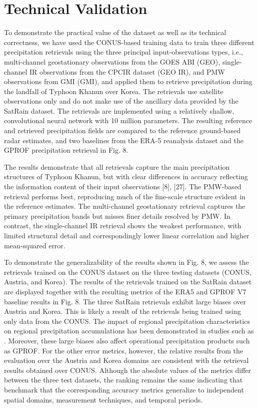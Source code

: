 \documentclass[11pt]{article}
\begin{document}
\section{Technical Validation}

To demonstrate the practical value of the dataset as well as its technical
correctness, we have used the CONUS-based training data to train three different
precipitation retrievals using the three principal input-observations types,
i.e., multi-channel geostationary observations from the GOES ABI (GEO),
single-channel IR observations from the CPCIR dataset (GEO IR), and PMW
observations from GMI (GMI), and applied them to retrieve precipitation during
the landfall of Typhoon Khanun over Korea. The retrievals use satellite
observations only and do not make use of the ancillary data provided by the
SatRain dataset. The retrievals are implemented using a relatively shallow,
convolutional neural network with 10 million parameters. The resulting reference
and retrieved precipitation fields are compared to the reference ground-based
radar estimates, and two baselines from the ERA-5 reanalysis dataset and the
GPROF precipitation retrieval in Fig. 8.

The results demonstrate that all retrievals capture the main precipitation
structures of Typhoon Khanun, but with clear differences in accuracy reflecting
the information content of their input observations [8], [27]. The PMW-based
retrieval performs best, reproducing much of the fine-scale structure evident in
the reference estimates. The multi-channel geostationary retrieval captures the
primary precipitation bands but misses finer details resolved by PMW. In
contrast, the single-channel IR retrieval shows the weakest performance, with
limited structural detail and correspondingly lower linear correlation and
higher mean-squared error.


To demonstrate the generalizability of the results shown in Fig. 8, we assess
the retrievals trained on the CONUS dataset on the three testing datasets
(CONUS, Austria, and Korea). The results of the retrievals trained on the
SatRain dataset are displayed together with the resulting metrics of the ERA5
and GPROF V7 baseline results in Fig. 8. The three SatRain retrievals exhibit
large biases over Austria and Korea. This is likely a result of the retrievals
being trained using only data from the CONUS. The impact of regional
precipitation characteristics on regional precipitation accumulations has been
demonstrated in studies such as . Moreover, these large biases also affect
operational precipitation products such as GPROF. For the other error metrics,
however, the relative results from the evaluation over the Austria and Korea
domains are consistent with the retrieval results obtained over CONUS. Although
the absolute values of the metrics differ between the three test datasets, the
ranking remains the same indicating that benchmark that the corresponding
accuracy metrics generalize to independent spatial domains, measurement
techniques, and temporal periods.
\end{document}
